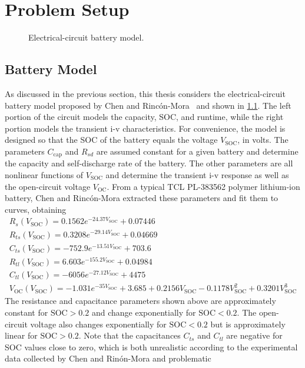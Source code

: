 \documentclass[../zhang_thesis.tex]{subfiles}
\begin{document}
\chapter{Problem Setup}


\begin{figure}[b]

\caption{Electrical-circuit battery model.}
\label{fig:batt_model}
\end{figure}

\section{Battery Model}
\label{sec:batt_mdl}

As discussed in the previous section, this thesis considers the electrical-circuit battery model proposed by Chen and Rinc\'on-Mora~\cite{chen06} and shown in \cref{fig:batt_model}. The left portion of the circuit models the capacity, SOC, and runtime, while the right portion models the transient i-v characteristics.  For convenience, the model is designed so that the SOC of the battery equals the voltage $V_\text{SOC}$, in volts. The parameters $C_\text{cap}$ and
$R_{sd}$ are assumed constant for a given battery and determine the capacity and self-discharge rate of the battery. The other parameters are all nonlinear functions of $V_\text{SOC}$ and determine the transient i-v response as well as the open-circuit voltage $V_\text{OC}$. From a typical TCL PL-383562 polymer lithium-ion battery, Chen and Rinc\'on-Mora extracted these parameters and fit them to curves, obtaining
\begin{gather}
    R_s(V_\text{SOC}) = 0.1562 e^{-24.37 V_\text{SOC}} + 0.07446 \label{eq:nl_param_1} \\
    R_{ts}(V_\text{SOC}) = 0.3208 e^{-29.14 V_\text{SOC}} + 0.04669 \\
    C_{ts}(V_\text{SOC}) = -752.9 e^{-13.51 V_\text{SOC}} + 703.6 \\
    R_{tl}(V_\text{SOC}) = 6.603 e^{-155.2 V_\text{SOC}} + 0.04984 \\
    C_{tl}(V_\text{SOC}) = -6056 e^{-27.12 V_\text{SOC}} + 4475 \\
    V_\text{OC}(V_\text{SOC}) = -1.031 e^{-35 V_\text{SOC}} + 3.685 + 0.2156 V_\text{SOC} - 0.1178 V_\text{SOC}^2 + 0.3201 V_\text{SOC}^3 \label{eq:nl_param_6}
\end{gather}
The resistance and capacitance parameters shown above are approximately constant for $\text{SOC}>0.2$ and change exponentially for $\text{SOC}<0.2$. The open-circuit voltage also changes exponentially for $\text{SOC}<0.2$ but is approximately linear for $\text{SOC}>0.2$. Note that the capacitances $C_{ts}$ and $C_{tl}$ are negative for SOC values close to zero, which is both unrealistic according to the experimental data collected by Chen and Rin\'on-Mora and problematic
\end{document}
